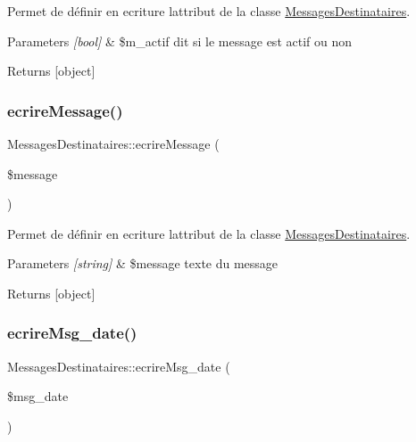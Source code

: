 Permet de définir en ecriture l\textquotesingle{}attribut de la classe \hyperlink{class_messages_destinataires}{Messages\+Destinataires}. 


\begin{DoxyParams}{Parameters}
{\em \mbox{[}bool\mbox{]}} & \$m\+\_\+actif dit si le message est actif ou non \\
\hline
\end{DoxyParams}
\begin{DoxyReturn}{Returns}
\mbox{[}object\mbox{]} 
\end{DoxyReturn}
\mbox{\label{class_messages_destinataires_a65fa214bdfd7209f433c932e649aedb6}} 
\subsubsection{\texorpdfstring{ecrire\+Message()}{ecrireMessage()}}
{\footnotesize\ttfamily Messages\+Destinataires\+::ecrire\+Message (\begin{DoxyParamCaption}\item[{}]{\$message }\end{DoxyParamCaption})}



Permet de définir en ecriture l\textquotesingle{}attribut de la classe \hyperlink{class_messages_destinataires}{Messages\+Destinataires}. 


\begin{DoxyParams}{Parameters}
{\em \mbox{[}string\mbox{]}} & \$message texte du message \\
\hline
\end{DoxyParams}
\begin{DoxyReturn}{Returns}
\mbox{[}object\mbox{]} 
\end{DoxyReturn}
\mbox{\label{class_messages_destinataires_a26431fda4297533eda6902c1f2f417f8}} 
\subsubsection{\texorpdfstring{ecrire\+Msg\+\_\+date()}{ecrireMsg\_date()}}
{\footnotesize\ttfamily Messages\+Destinataires\+::ecrire\+Msg\+\_\+date (\begin{DoxyParamCaption}\item[{}]{\$msg\+\_\+date }\end{DoxyParamCaption})}



